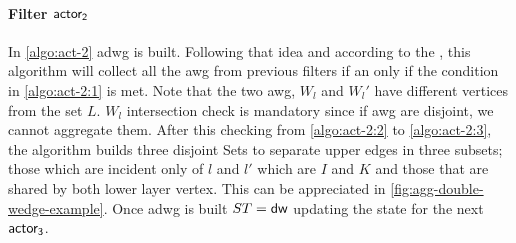 \paragraph{Filter $\mathsf{actor_2}$} In \autoref{algo:act-2} \acrshort{adwg} is built. Following that idea and according to the , this algorithm will collect all the \acrshort{awg} 
from previous filters if an only if the condition in \autoref{algo:act-2:1} is met. Note that the two \acrshort{awg}, $W_l$ and $W_l'$ have different vertices from the set $L$. $W_l$ intersection check is mandatory since if \acrshort{awg} are disjoint, we cannot aggregate them.
After this checking from \autoref{algo:act-2:2} to \autoref{algo:act-2:3}, the algorithm builds three disjoint Sets to separate upper edges in three subsets; those which are incident only of 
$l$ and $l'$ which are $I$ and $K$ and those that are shared by both lower layer vertex. This can be appreciated in \autoref{fig:agg-double-wedge-example}.
Once \acrshort{adwg} is built $ST = \mathsf{dw}$ updating the state for the next $\mathsf{actor_3}$.


